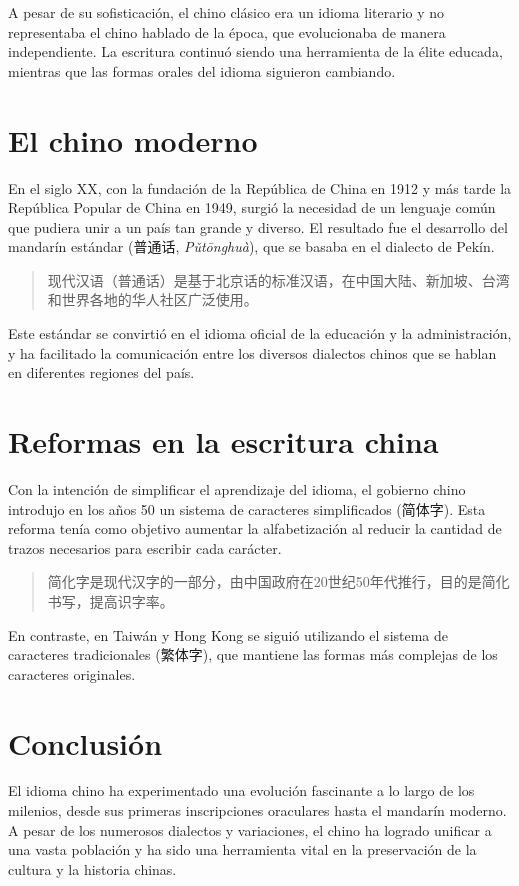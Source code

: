 A pesar de su sofisticación, el chino clásico era un idioma literario y no representaba el chino hablado de la época, que evolucionaba de manera independiente. La escritura continuó siendo una herramienta de la élite educada, mientras que las formas orales del idioma siguieron cambiando.

\section{El chino moderno}

En el siglo XX, con la fundación de la República de China en 1912 y más tarde la República Popular de China en 1949, surgió la necesidad de un lenguaje común que pudiera unir a un país tan grande y diverso. El resultado fue el desarrollo del mandarín estándar (普通话, \textit{Pǔtōnghuà}), que se basaba en el dialecto de Pekín.

\begin{quote}
现代汉语（普通话）是基于北京话的标准汉语，在中国大陆、新加坡、台湾和世界各地的华人社区广泛使用。
\end{quote}

Este estándar se convirtió en el idioma oficial de la educación y la administración, y ha facilitado la comunicación entre los diversos dialectos chinos que se hablan en diferentes regiones del país.

\section{Reformas en la escritura china}

Con la intención de simplificar el aprendizaje del idioma, el gobierno chino introdujo en los años 50 un sistema de caracteres simplificados (简体字). Esta reforma tenía como objetivo aumentar la alfabetización al reducir la cantidad de trazos necesarios para escribir cada carácter.

\begin{quote}
简化字是现代汉字的一部分，由中国政府在20世纪50年代推行，目的是简化书写，提高识字率。
\end{quote}

En contraste, en Taiwán y Hong Kong se siguió utilizando el sistema de caracteres tradicionales (繁体字), que mantiene las formas más complejas de los caracteres originales.

\section{Conclusión}

El idioma chino ha experimentado una evolución fascinante a lo largo de los milenios, desde sus primeras inscripciones oraculares hasta el mandarín moderno. A pesar de los numerosos dialectos y variaciones, el chino ha logrado unificar a una vasta población y ha sido una herramienta vital en la preservación de la cultura y la historia chinas.


